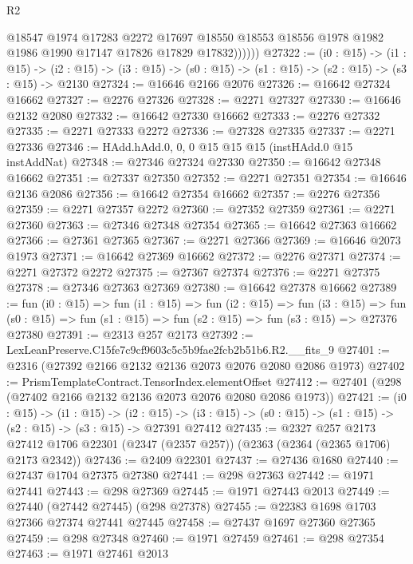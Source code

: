 \begin{lexlean}{R2}
\begin{coremodule}
                @18547
                @1974
                @17283
                @2272
                @17697
                @18550
                @18553
                @18556
                @1978
                @1982
                @1986
                @1990
                @17147
                @17826
                @17829
                @17832))))))
@27322 := (i0 : @15) ->
  (i1 : @15) ->
  (i2 : @15) -> (i3 : @15) -> (s0 : @15) -> (s1 : @15) -> (s2 : @15) -> (s3 : @15) -> @2130
@27324 := @16646 @2166 @2076
@27326 := @16642 @27324 @16662
@27327 := @2276 @27326
@27328 := @2271 @27327
@27330 := @16646 @2132 @2080
@27332 := @16642 @27330 @16662
@27333 := @2276 @27332
@27335 := @2271 @27333 @2272
@27336 := @27328 @27335
@27337 := @2271 @27336
@27346 := HAdd.hAdd.{0, 0, 0} @15 @15 @15 (instHAdd.{0} @15 instAddNat)
@27348 := @27346 @27324 @27330
@27350 := @16642 @27348 @16662
@27351 := @27337 @27350
@27352 := @2271 @27351
@27354 := @16646 @2136 @2086
@27356 := @16642 @27354 @16662
@27357 := @2276 @27356
@27359 := @2271 @27357 @2272
@27360 := @27352 @27359
@27361 := @2271 @27360
@27363 := @27346 @27348 @27354
@27365 := @16642 @27363 @16662
@27366 := @27361 @27365
@27367 := @2271 @27366
@27369 := @16646 @2073 @1973
@27371 := @16642 @27369 @16662
@27372 := @2276 @27371
@27374 := @2271 @27372 @2272
@27375 := @27367 @27374
@27376 := @2271 @27375
@27378 := @27346 @27363 @27369
@27380 := @16642 @27378 @16662
@27389 := fun (i0 : @15) =>
  fun (i1 : @15) =>
  fun (i2 : @15) =>
  fun (i3 : @15) =>
  fun (s0 : @15) => fun (s1 : @15) => fun (s2 : @15) => fun (s3 : @15) => @27376 @27380
@27391 := @2313 @257 @2173
@27392 := LexLeanPreserve.C15fe7c9cf9603c5c5b9fae2fcb2b51b6.R2.__fits_9
@27401 := @2316 (@27392 @2166 @2132 @2136 @2073 @2076 @2080 @2086 @1973)
@27402 := PrismTemplateContract.TensorIndex.elementOffset
@27412 := @27401 (@298 (@27402 @2166 @2132 @2136 @2073 @2076 @2080 @2086 @1973))
@27421 := (i0 : @15) ->
  (i1 : @15) ->
  (i2 : @15) -> (i3 : @15) -> (s0 : @15) -> (s1 : @15) -> (s2 : @15) -> (s3 : @15) -> @27391 @27412
@27435 := @2327
    @257
    @2173
    @27412
    @1706
    @22301
    (@2347 (@2357 @257))
    (@2363 (@2364 (@2365 @1706) @2173 @2342))
@27436 := @2409 @22301
@27437 := @27436 @1680
@27440 := @27437 @1704 @27375 @27380
@27441 := @298 @27363
@27442 := @1971 @27441
@27443 := @298 @27369
@27445 := @1971 @27443 @2013
@27449 := @27440 (@27442 @27445) (@298 @27378)
@27455 := @22383 @1698 @1703 @27366 @27374 @27441 @27445
@27458 := @27437 @1697 @27360 @27365
@27459 := @298 @27348
@27460 := @1971 @27459
@27461 := @298 @27354
@27463 := @1971 @27461 @2013

\end{coremodule}
\end{lexlean}

